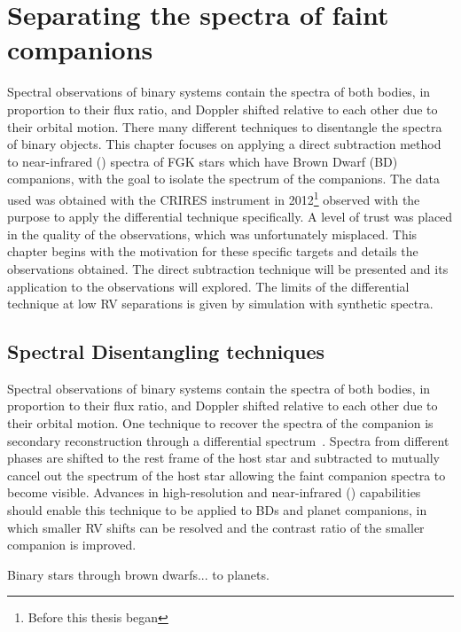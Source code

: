 
\chapter{Separating the spectra of faint companions} %
\label{cha:direct_recovery}

Spectral observations of binary systems contain the spectra of both bodies, in proportion to their flux ratio, and Doppler shifted relative to each other due to their orbital motion.
There many different techniques to disentangle the spectra of binary objects.
This chapter focuses on applying a direct subtraction method to near-infrared (\nir{}) spectra of {FGK} stars which have Brown Dwarf (BD) companions, with the goal to isolate the spectrum of the companions.
The data used was obtained with the {CRIRES} instrument in 2012\footnote{Before this thesis began} observed with the purpose to apply the differential technique specifically.
A level of trust was placed in the quality of the observations, which was unfortunately misplaced.
This chapter begins with the motivation for these specific targets and details the observations obtained.
The direct subtraction technique will be presented and its application to the observations will explored.
The limits of the differential technique at low {RV} separations is given by simulation with synthetic spectra.


\section{Spectral Disentangling techniques}
\todo{}

Spectral observations of binary systems contain the spectra of both bodies, in proportion to their flux ratio, and Doppler shifted relative to each other due to their orbital motion.
One technique to recover the spectra of the companion is secondary reconstruction through a differential spectrum~\citep{ferluga_separating_1997}.
Spectra from different phases are shifted to the rest frame of the host star and subtracted to mutually cancel out the spectrum of the host star allowing the faint companion spectra to become visible.
Advances in high-resolution and near-infrared (\nir{}) capabilities should enable this technique to be applied to BDs and planet companions, in which smaller {RV} shifts can be resolved and the contrast ratio of the smaller companion is improved.


Binary stars through brown dwarfs...
to planets.


